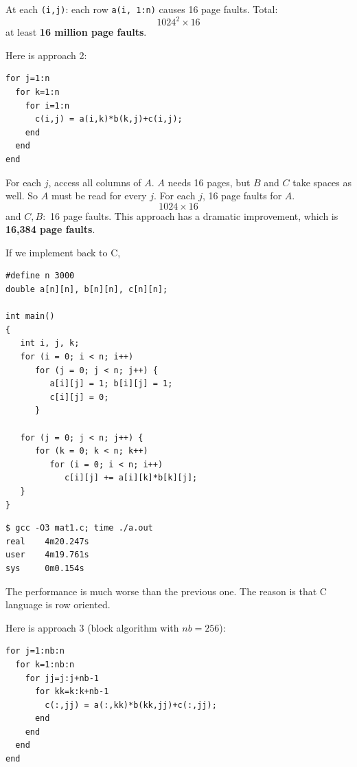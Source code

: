 At each \texttt{(i,j)}: each row \texttt{a(i, 1:n)} causes 16 page faults. Total: 
$$1024^2\times 16$$
at least \textbf{16 million page faults}.

\begin{eg}
    Here is approach 2:
\end{eg}

\begin{verbatim}
for j=1:n
  for k=1:n
    for i=1:n
      c(i,j) = a(i,k)*b(k,j)+c(i,j);
    end
  end
end
\end{verbatim}
For each $j$, access all columns of $A$. $A$ needs 16 pages, but $B$ and $C$ take spaces as well. So $A$ must be read for every $j$. For each $j$, 16 page faults for $A$.
$$1024\times 16$$
and 
$C,B:$ 16 page faults. This approach has a dramatic improvement, which is \textbf{16,384 page faults}.

If we implement back to C, 
\begin{verbatim}
#define n 3000
double a[n][n], b[n][n], c[n][n];

int main()
{
   int i, j, k;
   for (i = 0; i < n; i++)
      for (j = 0; j < n; j++) {
         a[i][j] = 1; b[i][j] = 1;
         c[i][j] = 0;
      }
         
   for (j = 0; j < n; j++) {
      for (k = 0; k < n; k++)
         for (i = 0; i < n; i++)
            c[i][j] += a[i][k]*b[k][j];
   }
}
\end{verbatim}

\begin{verbatim}
$ gcc -O3 mat1.c; time ./a.out
real    4m20.247s
user    4m19.761s
sys     0m0.154s
\end{verbatim}

The performance is much worse than the previous one. The reason is that C language is row oriented.

\begin{eg}
    Here is approach 3 (block algorithm with $nb = 256$):
\end{eg}

\begin{verbatim}
for j=1:nb:n
  for k=1:nb:n
    for jj=j:j+nb-1
      for kk=k:k+nb-1
        c(:,jj) = a(:,kk)*b(kk,jj)+c(:,jj);
      end
    end
  end
end
\end{verbatim}

